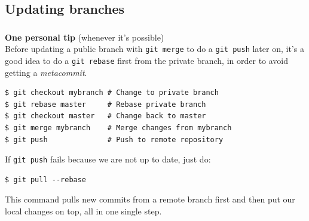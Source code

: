 \begin{frame}[fragile]
\begin{center}
  \end{center}

\end{frame}


\subsection{Updating branches}

\begin{frame}[fragile]
  \frametitle{\insertsubsection}

  \vspacing
  {\Large \textbf{One personal tip} (whenever it's possible)}\\
  \vspacing Before updating a public branch with \texttt{git merge} to
  do a \texttt{git push} later on, it's a good idea to do a
  \texttt{git rebase} first from the private branch, in order to avoid
  getting a \textit{metacommit}.

  \begin{small}
\begin{verbatim}
$ git checkout mybranch # Change to private branch
$ git rebase master     # Rebase private branch
$ git checkout master   # Change back to master
$ git merge mybranch    # Merge changes from mybranch
$ git push              # Push to remote repository
\end{verbatim}
  \end{small}

  If \texttt{git push} fails because we are not up to date, just do:
  \begin{small}
\begin{verbatim}
$ git pull --rebase
\end{verbatim}
  \end{small}
  This command pulls new commits from a remote branch first and then
  put our local changes on top, all in one single step.
\end{frame}


